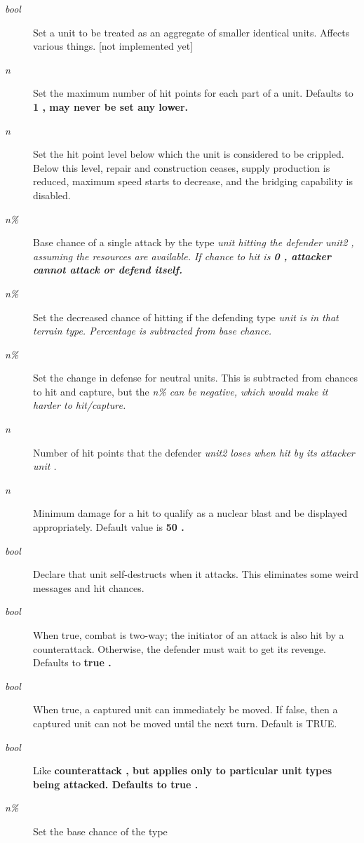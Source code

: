 \begin{description}
\item[{%
\it bool}]
Set a unit to be treated as an aggregate of smaller identical units.
Affects various things. [not implemented yet]
\item[{%
\it n}]
Set the maximum number of hit points for each part of a unit.
Defaults to %
\bf 1\rm%
, may never be set any lower.
\item[{%
\it n}]
Set the hit point level below which the unit is considered to be crippled.
Below this level, repair and construction ceases, supply production is
reduced, maximum speed starts to decrease,
and the bridging capability is disabled.
\item[{%
\it n\%}]
Base chance of a single attack by the type %
\it unit \rm%
hitting the defender %
\it unit2\rm%
, assuming the resources are available.
If chance to hit is %
\bf 0\rm%
, attacker cannot attack or defend itself.
\item[{%
\it n\%}]
Set the decreased chance of hitting if the defending type
%
\it unit \rm%
is in that terrain type.
Percentage is subtracted from base chance.
\item[{%
\it n\%}]
Set the change in defense for neutral units.
This is subtracted from chances to hit and capture, but the %
\it n\% \rm%
can be negative, which would make it harder to hit/capture.
\item[{%
\it n}]
Number of hit points that the defender %
\it unit2 \rm%
loses when hit by
its attacker %
\it unit\rm%
.
\item[{%
\it n}]
Minimum damage for a hit to qualify as a nuclear blast and be displayed
appropriately.  Default value is %
\bf 50\rm%
.
\item[{%
\it bool}]
Declare that unit self-destructs when it attacks.  This eliminates some
weird messages and hit chances.
\item[{%
\it bool}]
When true, combat is two-way; the initiator of an attack is also hit by
a counterattack.  Otherwise, the defender must wait to get its revenge.
Defaults to %
\bf true\rm%
.
\item[{%
\it bool}]
When true, a captured unit can immediately be moved.  If false, then a
captured unit can not be moved until the next turn.  Default is TRUE.
\item[{%
\it bool}]
Like %
\bf counterattack\rm%
, but applies only to particular unit types
being attacked.
Defaults to %
\bf true\rm%
.
\item[{%
\it n\%}]
Set the base chance of the type %

\end{description}
